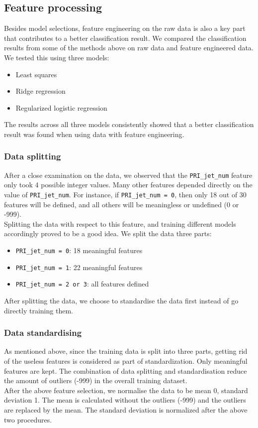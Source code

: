 \documentclass[10pt,conference,compsocconf]{IEEEtran}
\newcommand{\code}[1]{\texttt{#1}} %
\begin{document}
\subsection{Feature processing}

Besides model selections, feature engineering on the raw data is also a key part that contributes to a better classification result. We compared the classification results from some of the methods above on raw data and feature engineered data. We tested this using three models:
\begin{itemize}
\item
 Least squares
\item 
Ridge regression
\item 
Regularized logistic regression
\end{itemize}
The results across all three models consistently showed that a better classification result was found when using data with feature engineering. \\

\subsubsection{Data splitting}
After a close examination on the data, we observed that the \code{PRI\_jet\_num} feature only took 4 possible integer values.  Many other features depended directly on the value of \code{PRI\_jet\_num}. For instance, if \code{PRI\_jet\_num = 0}, then only 18 out of 30 features will be defined, and all others will be meaningless or undefined (0 or -999). \\
Splitting the data with respect to this feature, and training different models accordingly proved to be a good idea. We split the data three parts:
\begin{itemize}
\item \code{PRI\_jet\_num = 0}: 18 meaningful features
\item \code{PRI\_jet\_num = 1}: 22 meaningful features
\item \code{PRI\_jet\_num = 2 or 3}: all features defined
\end{itemize}
After splitting the data, we choose to standardise the data first instead of go directly training them. \\

\subsubsection{Data standardising}
As mentioned above, since the training data is split into three parts, getting rid of the useless features is considered as part of standardization. Only meaningful features are kept. The combination of data splitting and standardisation reduce the amount of outliers (-999) in the overall training dataset. \\
After the above feature selection, we normalise the data to be mean 0, standard deviation 1. The mean is calculated without the outliers (-999) and the outliers are replaced by the mean. The standard deviation is normalized after the above two procedures.
\end{document}
